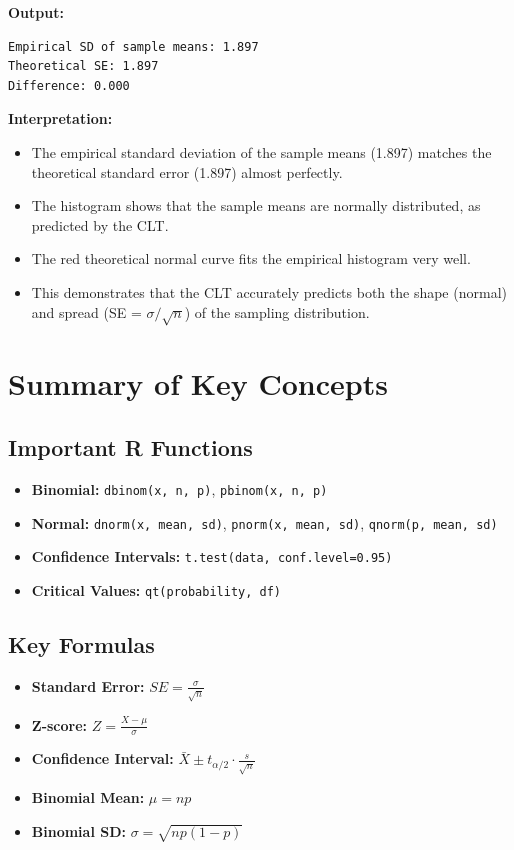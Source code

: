 \documentclass[11pt]{article}
\begin{document}
\begin{routput}
\textbf{Output:}
\begin{verbatim}
Empirical SD of sample means: 1.897
Theoretical SE: 1.897
Difference: 0.000
\end{verbatim}
\end{routput}

\textcolor{correctgreen}{\textbf{Interpretation:}}
\begin{itemize}
\item The empirical standard deviation of the sample means (1.897) matches the theoretical standard error (1.897) almost perfectly.
\item The histogram shows that the sample means are normally distributed, as predicted by the CLT.
\item The red theoretical normal curve fits the empirical histogram very well.
\item This demonstrates that the CLT accurately predicts both the shape (normal) and spread (SE = $\sigma/\sqrt{n}$) of the sampling distribution.
\end{itemize}

\section{Summary of Key Concepts}

\subsection{Important R Functions}

\begin{itemize}
\item \textbf{Binomial:} \texttt{dbinom(x, n, p)}, \texttt{pbinom(x, n, p)}
\item \textbf{Normal:} \texttt{dnorm(x, mean, sd)}, \texttt{pnorm(x, mean, sd)}, \texttt{qnorm(p, mean, sd)}
\item \textbf{Confidence Intervals:} \texttt{t.test(data, conf.level=0.95)}
\item \textbf{Critical Values:} \texttt{qt(probability, df)}
\end{itemize}

\subsection{Key Formulas}

\begin{itemize}
\item \textbf{Standard Error:} $SE = \frac{\sigma}{\sqrt{n}}$
\item \textbf{Z-score:} $Z = \frac{X - \mu}{\sigma}$
\item \textbf{Confidence Interval:} $\bar{X} \pm t_{\alpha/2} \cdot \frac{s}{\sqrt{n}}$
\item \textbf{Binomial Mean:} $\mu = np$
\item \textbf{Binomial SD:} $\sigma = \sqrt{np(1-p)}$
\end{itemize}
\end{document}

